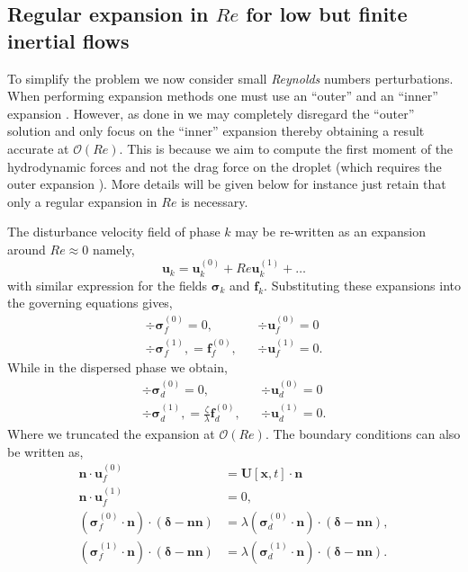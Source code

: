 \subsection{Regular expansion in $Re$ for low but finite inertial flows}

To simplify the problem we now consider small \textit{Reynolds} numbers perturbations. 
When performing expansion methods one must use an ``outer'' and an ``inner'' expansion \citet{proudman1957expansions}. 
However, as done in \citet{stone2001inertial,raja2010inertial,jiang2021inertial} we may completely disregard the ``outer'' solution and only focus on the ``inner'' expansion thereby obtaining a result accurate at $\mathcal{O}(Re)$. 
This is because we aim to compute the first moment of the hydrodynamic forces and not the drag force on the droplet (which requires the outer expansion \citep{proudman1957expansions}). 
More details will be given below for instance just retain that only a regular expansion in $Re$ is necessary.

The disturbance velocity field of phase $k$ may be re-written as an expansion around $Re \approx 0$ namely, 
\begin{equation*}
    \textbf{u}_k = \textbf{u}_k^{(0)} + Re \textbf{u}_k^{(1)} + \ldots
\end{equation*}
with similar expression for the fields $\bm\sigma_k$ and $\textbf{f}_k$. 
Substituting these expansions into the governing equations gives,
\begin{align}
    \div\bm\sigma_f^{(0)}
    = 0,
    && \div \textbf{u}_f^{(0)} = 0 
    \label{eq:zeroth_order_NS_f}
    \\
    \div\bm\sigma_f^{(1)},
    =  \textbf{f}_f^{(0)},
    && \div \textbf{u}_f^{(1)} = 0.  
    \label{eq:first_order_NS_f}
\end{align}
While in the dispersed phase we obtain, 
\begin{align}
    \div\bm\sigma_d^{(0)}
    = 0,
    && \div \textbf{u}_d^{(0)} = 0 
    \label{eq:zeroth_order_NS_d}
    \\
    \div\bm\sigma_d^{(1)},
    = \frac{\zeta}{\lambda} \textbf{f}_d^{(0)},
    && \div \textbf{u}_d^{(1)} = 0. 
    \label{eq:first_order_NS_f}
\end{align}
Where we truncated the expansion at $\mathcal{O}(Re)$.  
The boundary conditions can also be written as, 
\begin{align}
    \textbf{n}\cdot\textbf{u}_f^{(0)}
    &= \textbf{U}[\textbf{x},t]\cdot \textbf{n} \\
    \textbf{n}\cdot\textbf{u}_f^{(1)}
    &= 0, \\
    \label{eq:bc_non_inertia}
    (\bm\sigma_f^{(0)}\cdot\textbf{n})\cdot (\bm\delta - \textbf{nn})
    &= \lambda (\bm\sigma_d^{(0)}\cdot \textbf{n})\cdot (\bm\delta - \textbf{nn}),\\
    (\bm\sigma_f^{(1)}\cdot\textbf{n})\cdot (\bm\delta - \textbf{nn})
    &= \lambda (\bm\sigma_d^{(1)}\cdot \textbf{n})\cdot (\bm\delta - \textbf{nn}). 
    \label{eq:bc_inertial}
\end{align}


